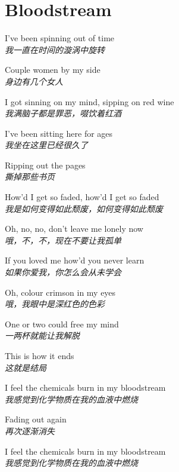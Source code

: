 \section{Bloodstream}

\thispagestyle{empty}


\begin{spacing}{1.5}
\begin{flushleft}
I've been spinning out of time\\
\textit{我一直在时间的漩涡中旋转}\lyricspace

Couple women by my side\\
\textit{身边有几个女人}\lyricspace

I got sinning on my mind, sipping on red wine\\
\textit{我满脑子都是罪恶，啜饮着红酒}\lyricspace

I've been sitting here for ages\\
\textit{我坐在这里已经很久了}\lyricspace

Ripping out the pages\\
\textit{撕掉那些书页}\lyricspace

How'd I get so faded, how'd I get so faded\\
\textit{我是如何变得如此颓废，如何变得如此颓废}\lyricspace

Oh, no, no, don't leave me lonely now\\
\textit{哦，不，不，现在不要让我孤单}\lyricspace

If you loved me how'd you never learn\\
\textit{如果你爱我，你怎么会从未学会}\lyricspace

Oh, colour crimson in my eyes\\
\textit{哦，我眼中是深红色的色彩}\lyricspace

One or two could free my mind\\
\textit{一两杯就能让我解脱}\lyricspace

This is how it ends\\
\textit{这就是结局}\lyricspace

I feel the chemicals burn in my bloodstream\\
\textit{我感觉到化学物质在我的血液中燃烧}\lyricspace

Fading out again\\
\textit{再次逐渐消失}\lyricspace

I feel the chemicals burn in my bloodstream\\
\textit{我感觉到化学物质在我的血液中燃烧}\lyricspace


\end{flushleft}
\end{spacing}
